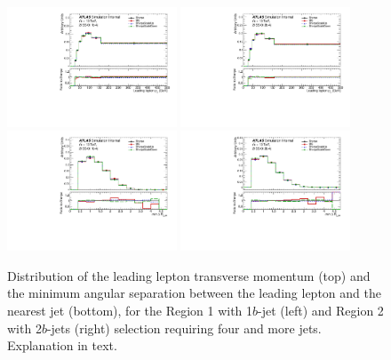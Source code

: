 \begin{figure}[!htb]
\centering
\includegraphics[width=0.45\textwidth]{Plots/ttV/shape/c_Region_0_lep_Pt_0}
\includegraphics[width=0.45\textwidth]{Plots/ttV/shape/c_Region_1_lep_Pt_0}\\
\includegraphics[width=0.45\textwidth]{Plots/ttV/shape/c_Region_0_min_DRl0j}
\includegraphics[width=0.45\textwidth]{Plots/ttV/shape/c_Region_1_min_DRl0j}\\
  \caption{Distribution of the leading lepton transverse momentum (top) and the minimum angular separation between the leading lepton and the nearest jet (bottom), for the Region 1 with 1$b$-jet (left) and Region 2 with 2$b$-jets (right) selection requiring four and more jets. Explanation in text.
  \label{ttV:lep_kin}}
\end{figure}

